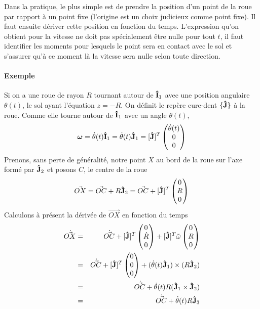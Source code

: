 Dans la pratique, le plus simple est de prendre la position d'un point de la roue par rapport à un point fixe (l'origine est un choix judicieux comme point fixe).
Il faut ensuite dériver cette position en fonction du temps.
L'expression qu'on obtient pour la vitesse ne doit pas spécialement être nulle pour tout $t$, il faut identifier les moments pour lesquels le point sera en contact avec le sol et s'assurer qu'à ce moment là la vitesse sera nulle selon toute direction.

\paragraph{Exemple}
Si on a une roue de rayon $R$ tournant autour de ${\bf\hat{I}}_1$ avec une position angulaire $\theta(t)$, le sol ayant l'équation $z = -R$.
On définit le repère cure-dent $\{{\bf\hat{J}}\}$ à la roue.
Comme elle tourne autour de ${\bf\hat{I}}_1$ avec un angle $\theta(t)$,
\[ {\bm \omega} = \dot{\theta}(t) {\bf\hat{I}}_1 = \dot{\theta}(t) {\bf\hat{J}}_1 = [{\bf\hat{J}}]^T \begin{pmatrix}\dot{\theta}(t)\\0\\0\end{pmatrix} \]
Prenons, sans perte de généralité, notre point $X$ au bord de la roue sur l'axe formé par ${\bf\hat{J}}_2$ et posons $C$, le centre de la roue
\[ \vec{OX} = \vec{OC} + R {\bf\hat{J}}_2 = \vec{OC} + [{\bf\hat{J}}]^T \begin{pmatrix}0\\R\\0\end{pmatrix} \]
Calculons à présent la dérivée de $\vec{OX}$ en fonction du temps
\begin{eqnarray*}
	\dot{\vec{ OX}} &=& \dot{\vec{ OC}} + [{\bf\hat{J}}]^T \begin{pmatrix}0\\\dot{R}\\0\end{pmatrix} + [{\bf\hat{J}}]^T \tilde{\omega} \begin{pmatrix}0\\R\\0\end{pmatrix}\\
	&=& \dot{\vec{ OC}} + [{\bf\hat{J}}]^T \begin{pmatrix}0\\0\\0\end{pmatrix} + (\dot{\theta}(t) {\bf\hat{J}}_1) \times (R {\bf\hat{J}}_2)\\
	&=& \dot{\vec{ OC}} + \dot{\theta}(t) R ({\bf\hat{J}}_1 \times {\bf\hat{J}}_2)\\
	&=& \dot{\vec{ OC}} + \dot{\theta}(t) R {\bf\hat{J}}_3\\
\end{eqnarray*}
